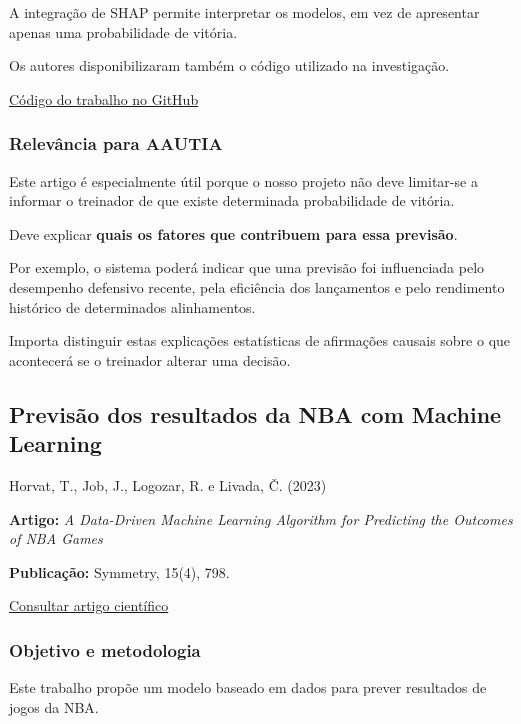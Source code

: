A integração de SHAP permite interpretar os modelos, em vez de apresentar apenas uma probabilidade de vitória.

Os autores disponibilizaram também o código utilizado na investigação.

\href{https://github.com/YanOuyang514/NBA-game-outcome-prediction-and-quantitative-analysis-methodology}{Código do trabalho no GitHub}

\subsubsection{Relevância para AAUTIA}\label{aautia:relevuxe2ncia-para-aautia-1}

Este artigo é especialmente útil porque o nosso projeto não deve limitar-se a informar o treinador de que existe determinada probabilidade de vitória.

Deve explicar \textbf{quais os fatores que contribuem para essa previsão}.

Por exemplo, o sistema poderá indicar que uma previsão foi influenciada pelo desempenho defensivo recente, pela eficiência dos lançamentos e pelo rendimento histórico de determinados alinhamentos.

Importa distinguir estas explicações estatísticas de afirmações causais sobre o que acontecerá se o treinador alterar uma decisão.

\subsection{Previsão dos resultados da NBA com Machine Learning}\label{aautia:previsuxe3o-dos-resultados-da-nba-com-machine-learning}

Horvat, T., Job, J., Logozar, R. e Livada, Č. (2023) \cite{horvat2023}

\textbf{Artigo:} \emph{A Data-Driven Machine Learning Algorithm for Predicting the Outcomes of NBA Games}

\textbf{Publicação:} Symmetry, 15(4), 798.

\href{https://doi.org/10.3390/sym15040798}{Consultar artigo científico}

\subsubsection{Objetivo e metodologia}\label{aautia:objetivo-e-metodologia-2}

Este trabalho propõe um modelo baseado em dados para prever resultados de jogos da NBA.

